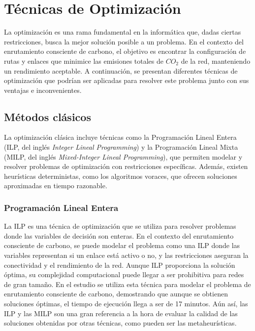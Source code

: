 \section{Técnicas de Optimización}

La optimización es una rama fundamental en la informática que, dadas ciertas restricciones, busca la mejor solución posible a un problema. En el contexto del enrutamiento consciente de carbono, el objetivo es encontrar la configuración de rutas y enlaces que minimice las emisiones totales de $CO_2$ de la red, manteniendo un rendimiento aceptable. A continuación, se presentan diferentes técnicas de optimización que podrían ser aplicadas para resolver este problema junto con sus ventajas e inconvenientes.

\subsection{Métodos clásicos}

La optimización clásica incluye técnicas como la Programación Lineal Entera (ILP, del inglés \textit{Integer Lineal Programming}) y la Programación Lineal Mixta (MILP, del inglés \textit{Mixed-Integer Lineal Programming}), que permiten modelar y resolver problemas de optimización con restricciones específicas. Además, existen heurísticas deterministas, como los algoritmos voraces, que ofrecen soluciones aproximadas en tiempo razonable.

\subsubsection{Programación Lineal Entera}

La ILP es una técnica de optimización que se utiliza para resolver problemas donde las variables de decisión son enteras. En el contexto del enrutamiento consciente de carbono, se puede modelar el problema como una ILP donde las variables representan si un enlace está activo o no, y las restricciones aseguran la conectividad y el rendimiento de la red. Aunque ILP proporciona la solución óptima, su complejidad computacional puede llegar a ser prohibitiva para redes de gran tamaño. En el estudio \cite{GomezdelaHiz2025} se utiliza esta técnica para modelar el problema de enrutamiento consciente de carbono, demostrando que aunque se obtienen soluciones óptimas, el tiempo de ejecución llega a ser de 17 minutos. Aún así, las ILP y las MILP son una gran referencia a la hora de evaluar la calidad de las soluciones obtenidas por otras técnicas, como pueden ser las metaheurísticas.

